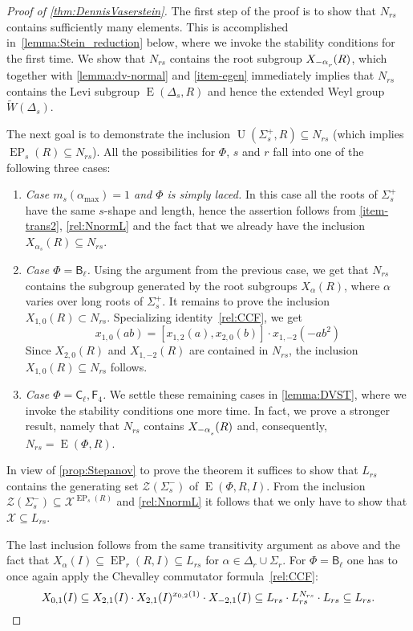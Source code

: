\documentclass[oneside, 12pt]{amsart}
\theoremstyle{plain}
\numberwithin{equation}{section}
\numberwithin{lemma}{section}
\theoremstyle{definition}
\theoremstyle{remark}
\DeclareMathOperator{\E}{E}
\DeclareMathOperator{\EP}{EP}
\DeclareMathOperator{\U}{U}
\newcommand{\rB}{\mathsf{B}}
\newcommand{\rC}{\mathsf{C}}
\newcommand{\rF}{\mathsf{F}}
\def\ssub#1{\mathchoice
   {_{\lower2pt\hbox{$\scriptstyle #1$}}}
   {_{\lower2pt\hbox{$\scriptstyle #1$}}}
   {_{\lower1.5pt\hbox{$\scriptscriptstyle #1$}}}
   {_{\!\lower1.5pt\hbox{$\scriptscriptstyle #1$}}}}
\begin{document}
\begin{proof}[Proof of \cref{thm:DennisVaserstein}]
The first step of the proof is to show that $N_{rs}$ contains sufficiently many elements. 
This is accomplished in~\cref{lemma:Stein_reduction} below, where we invoke the stability conditions for the first time.
We show that $N_{rs}$ contains the root subgroup $X_{-\alpha\ssub{r}}(R)$, which together with \cref{lemma:dv-normal} and \cref{item-egen} immediately implies that $N_{rs}$ contains the Levi subgroup $\E(\Delta_s, R)$ and hence the extended Weyl group $\widetilde{W}(\Delta_s)$.

The next goal is to demonstrate the inclusion $\U(\Sigma_s^+, R) \subseteq N_{rs}$ (which implies $\EP_s(R) \subseteq N_{rs}$).
All the possibilities for $\Phi$, $s$ and $r$ fall into one of the following three cases:
\begin{enumerate}
 \item \textit{Case $m_s(\alpha_{\mathrm{max}})=1$ and $\Phi$ is simply laced.}
  In this case all the roots of $\Sigma^+_s$ have the same $s$-shape and length, hence the assertion follows from \cref{item-trans2}, \eqref{rel:NnormL} and the fact that we already have the inclusion $X_{\alpha_s}(R) \subseteq N_{rs}$.
 \item \textit{Case $\Phi = \rB_\ell$.} Using the argument from the previous case, we get that $N_{rs}$ contains the subgroup generated by the root subgroups $X_\alpha(R)$, where $\alpha$ varies over long roots of $\Sigma_s^+$. 
  It remains to prove the inclusion $X_{1, 0}(R) \subset N_{rs}$.
  Specializing identity~\eqref{rel:CCF}, we get \begin{equation*} \label{rel:CCF-specBC} x_{1, 0}(ab) = [x_{1, 2}(a), x_{2, 0}(b)] \cdot x_{1, -2}(-a b^2) \end{equation*}
  Since $X_{2, 0}(R)$ and $X_{1, -2}(R)$ are contained in $N_{rs}$, the inclusion $X_{1, 0}(R) \subseteq N_{rs}$ follows.
 \item \textit{Case $\Phi = \rC_\ell, \rF_4$.}
 We settle these remaining cases in \cref{lemma:DVST}, where we invoke the stability conditions one more time. 
 In fact, we prove a stronger result, namely that $N_{rs}$ contains $X_{-\alpha\ssub{s}}(R)$ and, consequently, $N_{rs} = \E(\Phi, R)$.
\end{enumerate}

In view of \cref{prop:Stepanov} to prove the theorem it suffices to show that $L_{rs}$ contains the generating set $\mathcal{Z}(\Sigma_s^-)$ of $\E(\Phi, R, I)$.
From the inclusion $\mathcal{Z}(\Sigma_s^-) \subseteq \mathcal{X}^{\EP_s(R)}$ and \eqref{rel:NnormL} it follows that we only have to show that $\mathcal{X} \subseteq L_{rs}$.

The last inclusion follows from the same transitivity argument as above and the fact that $X_\alpha(I) \subseteq \EP_r(R, I) \subseteq L_{rs}$ for $\alpha \in \Delta_r \cup \Sigma_r$.
For $\Phi=\rB_\ell$ one has to once again apply the Chevalley commutator formula~\eqref{rel:CCF}:
\[ X_{0, 1}(I) \subseteq X_{2, 1}(I) \cdot X_{2, 1}(I)^{x_{0, 2}(1)} \cdot X_{-2, 1}(I) \subseteq L_{rs} \cdot L_{rs}^{N_{rs}} \cdot L_{rs} \subseteq L_{rs}. \qedhere \] 
\end{proof}
\end{document}
